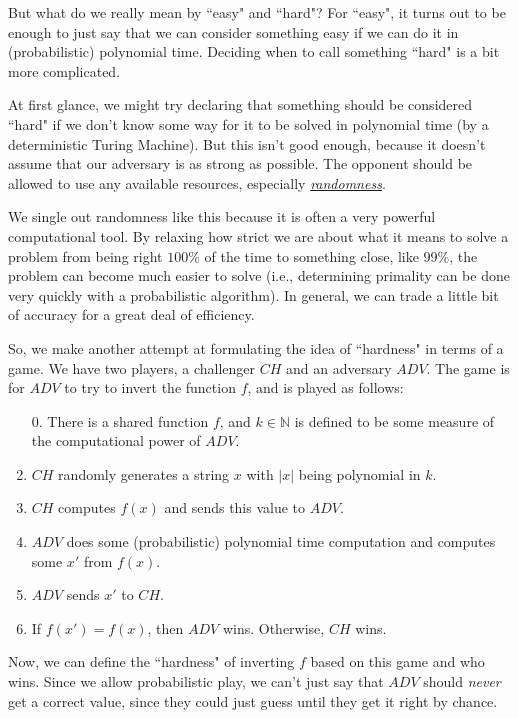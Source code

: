 \documentclass[11pt]{article}
\newcommand{\N}{\mathbb{N}}
\begin{document}
But what do we really mean by ``easy" and ``hard"? For ``easy", it turns out to be enough to just say that we can consider something easy if we can do it in (probabilistic) polynomial time. Deciding when to call something ``hard" is a bit more complicated.\smallskip

At first glance, we might try declaring that something should be considered ``hard" if we don't know some way for it to be solved in polynomial time (by a deterministic Turing Machine). But this isn't good enough, because it doesn't assume that our adversary is as strong as possible. The opponent should be allowed to use any available resources, especially \emph{\underline{randomness}}.

We single out randomness like this because it is often a very powerful computational tool. By relaxing how strict we are about what it means to solve a problem from being right \(100\%\) of the time to something close, like \(99\%\), the problem can become much easier to solve (i.e., determining primality can be done very quickly with a probabilistic algorithm). In general, we can trade a little bit of accuracy for a great deal of efficiency.\smallskip

\newpage
So, we make another attempt at formulating the idea of ``hardness" in terms of a game. We have two players, a challenger \(CH\) and an adversary \(ADV\). The game is for \(ADV\) to try to invert the function \(f\), and is played as follows:\medskip

\begin{enumerate}
\item[0.] There is a shared function \(f\), and \(k\in\N\) is defined to be some measure of the computational power of \(ADV\).
\item \(CH\) randomly generates a string \(x\) with \(|x|\) being polynomial in \(k\).
\item \(CH\) computes \(f(x)\) and sends this value to \(ADV\).
\item \(ADV\) does some (probabilistic) polynomial time computation and computes some \(x'\) from \(f(x)\).
\item \(ADV\) sends \(x'\) to \(CH\).
\item If \(f(x')=f(x)\), then \(ADV\) wins. Otherwise, \(CH\) wins.
\end{enumerate}\medskip

Now, we can define the ``hardness" of inverting \(f\) based on this game and who wins. Since we allow probabilistic play, we can't just say that \(ADV\) should \emph{never} get a correct value, since they could just guess until they get it right by chance.
\end{document}
